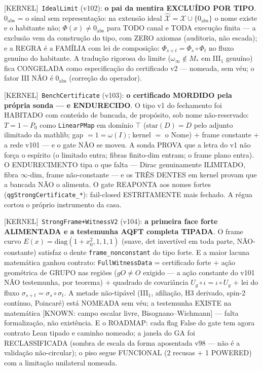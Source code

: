 \documentclass[11pt]{article}
\providecommand{\kernelmk}[1]{\textsf{[KERNEL]}~\texttt{#1}}\providecommand{\knownmk}[1]{\textsf{[KNOWN]}~{#1}}\providecommand{\statusmk}[1]{\textsf{[#1]}}
\theoremstyle{definition}\newtheorem{deriv}{Derivação}
\begin{document}
\kernelmk{IdealLimit} (v102): \textbf{o pai da mentira EXCLUÍDO POR TIPO}. $0_{\mathrm{abs}}$ = o sinal sem representação: na extensão ideal $\hat{\mathcal{X}}=\mathcal{X}\cup\{0_{\mathrm{abs}}\}$ o nome existe e o habitante não; $\Phi(x)\neq 0_{\mathrm{abs}}$ para TODO canal e TODA execução finita --- a exclusão vem da construção do tipo, com ZERO axiomas (auditoria, não escada); e a REGRA é a FAMÍLIA com lei de composição: $\Phi_{s+t}=\Phi_s\circ\Phi_t$ no fluxo genuíno do habitante. A tradução rigorosa do limite ($\omega_\infty\notin M_*$ em III$_1$ genuíno) fica CONGELADA como especificação do certificado v2 --- nomeada, sem véu; o fator III NÃO é $0_{\mathrm{abs}}$ (correção do operador).

\kernelmk{BenchCertificate} (v103): \textbf{o certificado MORDIDO pela própria sonda --- e ENDURECIDO}. O tipo v1 do fechamento foi HABITADO com conteúdo de bancada, de propósito, sob nome não-reservado: $T=1-P_0$ como \texttt{LinearPMap} em domínio $\top$ ($\mathrm{star}(D)=D$ pelo adjunto ilimitado da mathlib; gap $=1=\omega(I)$; kernel $=$ o Nome) $+$ frame constante $+$ a rede v101 --- e o gate NÃO se moveu. A sonda PROVA que a letra do v1 não força o espírito (o limitado entra; fibras finito-dim entram; o frame plano entra). O ENDURECIMENTO tipa o que falta --- Dirac genuinamente ILIMITADO, fibra $\infty$-dim, frame não-constante --- e os TRÊS DENTES em kernel provam que a bancada NÃO o alimenta. O gate REAPONTA aos nomes fortes (\texttt{qgStrongCertificate\_*}): fail-closed ESTRITAMENTE mais fechado. A régua cortou o próprio instrumento da casa.

\kernelmk{StrongFrame+\allowbreak WitnessV2} (v104): \textbf{a primeira face forte ALIMENTADA e a testemunha AQFT completa TIPADA}. O frame curvo $E(x)=\mathrm{diag}(1+x_0^2,1,1,1)$ (suave, det invertível em toda parte, NÃO-constante) satisfaz o dente \texttt{frame\_nonconstant} do tipo forte. E a maior lacuna matemática ganhou contrato: \texttt{FullWitnessData} = certificado forte $+$ ação geométrica de GRUPO nas regiões ($gO\neq O$ exigido --- a ação constante do v101 NÃO testemunha, por teorema) $+$ quadrado de covariância $U_g\circ\iota=\iota\circ U_g$ $+$ lei do fluxo $\sigma_{s+t}=\sigma_s\circ\sigma_t$. A metade não-tipável (III$_1$, afiliação, H3 derivado, spin-2 contínuo, Poincaré) está NOMEADA sem véu; a testemunha EXISTE na matemática [KNOWN: campo escalar livre, Bisognano--Wichmann] --- falta formalização, não existência. E o ROADMAP: cada flag False do gate tem agora contrato Lean tipado e caminho nomeado; a janela do GA foi RECLASSIFICADA (sombra de escala da forma aposentada v98 --- não é a validação não-circular); o piso segue FUNCIONAL (2 recusas + 1 POWERED) com a limitação unilateral nomeada.
\end{document}
